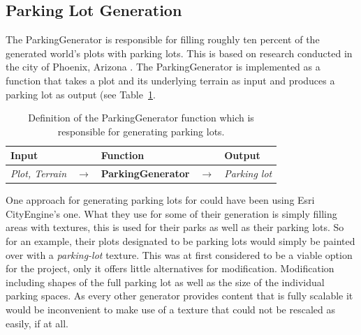 \subsection{Parking Lot Generation}
The ParkingGenerator is responsible for filling roughly ten percent of the generated world's plots with parking lots.
This is based on research conducted in the city of Phoenix, Arizona \cite{percent}.
The ParkingGenerator is implemented as a function that takes a plot and its underlying terrain as input and produces a parking lot as output (see Table~\ref{table:parking}.
\begin{table}[H]
   \centering
   \begin{tabular}{lllll}
     \textbf{Input}                           &               & \textbf{Function}            &               & \textbf{Output}         \\
     \midrule
     \textit{Plot, Terrain}                   & $\rightarrow$ & \textbf{ParkingGenerator}       & $\rightarrow$ & \textit{Parking lot}           \\
     \bottomrule
   \end{tabular}

   \caption{Definition of the ParkingGenerator function which is responsible for generating parking lots.}
   \label{table:parking}
 \end{table}
 \vspace{-0.4cm}


One approach for generating parking lots for could have been using Esri CityEngine's \cite{Esri} one. %
What they use for some of their generation is simply filling areas with textures, this is used for their parks as well as their parking lots. 
So for an example, their plots designated to be parking lots would simply be painted over with a \textit{parking-lot} texture. 
This was at first considered to be a viable option for the project, only it offers little alternatives for modification. 
Modification including shapes of the full parking lot as well as the size of the individual parking spaces. 
As every other generator provides content that is fully scalable it would be inconvenient to make use of a texture that could not be rescaled as easily, if at all.

